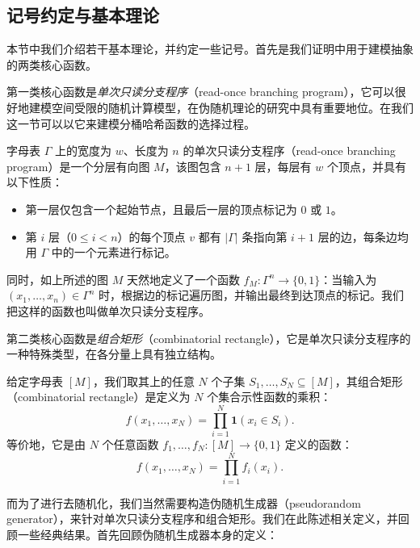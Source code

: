 \subsection{记号约定与基本理论}\label{sec:prelim_construction}

本节中我们介绍若干基本理论，并约定一些记号。首先是我们证明中用于建模抽象的两类核心函数。

第一类核心函数是\emph{单次只读分支程序}（read-once branching program），它可以很好地建模空间受限的随机计算模型，在伪随机理论的研究中具有重要地位。在我们这一节可以以它来建模分桶哈希函数的选择过程。

\begin{definition}[单次只读分支程序]\label{def:ROBP}
    字母表 $\Gamma$ 上的宽度为 $w$、长度为 $n$ 的单次只读分支程序（read-once branching program）是一个分层有向图 $M$，该图包含 $n + 1$ 层，每层有 $w$ 个顶点，并具有以下性质：
    \begin{itemize}
        \item 第一层仅包含一个起始节点，且最后一层的顶点标记为 $0$ 或 $1$。

        \item 第 $i$ 层（$0 \le i < n$）的每个顶点 $v$ 都有 $|\Gamma|$ 条指向第 $i + 1$ 层的边，每条边均用 $\Gamma$ 中的一个元素进行标记。
    \end{itemize}

    同时，如上所述的图 $M$ 天然地定义了一个函数 $f_M : \Gamma^n \to \{0, 1\}$：当输入为 $(x_1, \ldots, x_n) \in \Gamma^n$ 时，根据边的标记遍历图，并输出最终到达顶点的标记。我们把这样的函数也叫做单次只读分支程序。
\end{definition}

第二类核心函数是\emph{组合矩形}（combinatorial rectangle），它是单次只读分支程序的一种特殊类型，在各分量上具有独立结构。

\begin{definition}[组合矩形]\label{def:comb_rect}
    给定字母表 $[M]$，我们取其上的任意 $N$ 个子集 $S_1, \ldots, S_N \subseteq [M]$，其组合矩形（combinatorial rectangle）是定义为 $N$ 个集合示性函数的乘积：
    $$
    f(x_1, \ldots, x_N) = \prod_{i = 1}^N \mathbf{1}(x_i \in S_i).
    $$
    等价地，它是由 $N$ 个任意函数 $f_1, \ldots, f_N:[M] \to \{0,1\}$ 定义的函数：
    $$
    f(x_1, \ldots, x_N) = \prod_{i = 1}^N f_i(x_i).
    $$ 
\end{definition}

而为了进行去随机化，我们当然需要构造伪随机生成器（pseudorandom generator），来针对单次只读分支程序和组合矩形。我们在此陈述相关定义，并回顾一些经典结果。首先回顾伪随机生成器本身的定义：

